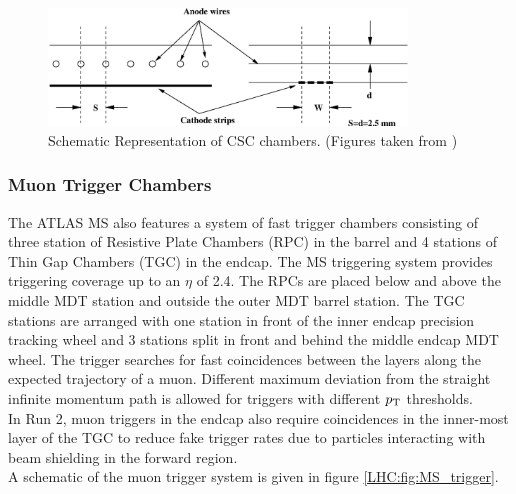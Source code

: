 \begin{figure}[h!]
\centering
\includegraphics[width=0.85\textwidth, angle=0]{figures/LHC_ATLAS/CSC_structure.eps}
\caption{ Schematic Representation of CSC chambers. (Figures taken from \cite{ATLAS_JINST}) \label{LHC:fig:MDT}}
\end{figure}

\subsubsection*{Muon Trigger Chambers}

\indent  The ATLAS MS also features a system of fast trigger chambers consisting of three station of Resistive Plate Chambers (RPC) in the barrel and 4 stations of Thin Gap Chambers (TGC) in the endcap.  The MS triggering system provides triggering coverage up to an $\eta$ of 2.4.  The RPCs are placed below and above the middle MDT station and outside the outer MDT barrel station.  The TGC stations are arranged with one station in front of the inner endcap precision tracking wheel and 3 stations split in front and behind the middle endcap MDT wheel.  The trigger searches for fast coincidences between the layers along the expected trajectory of a muon.  Different maximum deviation from the straight infinite momentum path is allowed for triggers with different $p_{\mathrm{T}}$ thresholds. \\

\indent In Run 2, muon triggers in the endcap also require coincidences in the inner-most layer of the TGC to reduce fake trigger rates due to particles interacting with beam shielding in the forward region. \\

\indent A schematic of the muon trigger system is given in figure \ref{LHC:fig:MS_trigger}. \\

